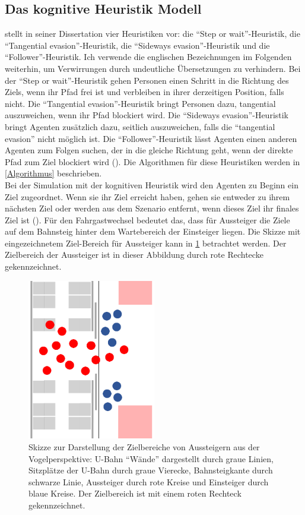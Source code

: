 \subsection{Das kognitive Heuristik Modell} \label{CHM}
\cite{Seitz.2016} stellt in seiner Dissertation vier Heuristiken vor: die "`Step or wait"'-Heuristik, die "`Tangential evasion"'-Heuristik, die "`Sideways evasion"'-Heuristik und die "`Follower"'-Heuristik. Ich verwende die englischen Bezeichnungen im Folgenden weiterhin, um Verwirrungen durch undeutliche Übersetzungen zu verhindern. Bei der "`Step or wait"'-Heuristik gehen Personen einen Schritt in die Richtung des Ziels, wenn ihr Pfad frei ist und verbleiben in ihrer derzeitigen Position, falls nicht. Die "`Tangential evasion"'-Heuristik bringt Personen dazu, tangential auszuweichen, wenn ihr Pfad blockiert wird. Die "`Sideways evasion"'-Heuristik bringt Agenten zusätzlich dazu, seitlich auszuweichen, falls die "`tangential evasion"' nicht möglich ist. Die "`Follower"'-Heuristik lässt Agenten einen anderen Agenten zum Folgen suchen, der in die gleiche Richtung geht, wenn der direkte Pfad zum Ziel blockiert wird (\cite{Seitz.2016}). Die Algorithmen für diese Heuristiken werden in \ref{Algorithmus} beschrieben. \\
Bei der Simulation mit der kognitiven Heuristik wird den Agenten zu Beginn ein Ziel zugeordnet. Wenn sie ihr Ziel erreicht haben, gehen sie entweder zu ihrem nächsten Ziel oder werden aus dem Szenario entfernt, wenn dieses Ziel ihr finales Ziel ist (\cite{Seitz.2016}). Für den Fahrgastwechsel bedeutet das, dass für Aussteiger die Ziele auf dem Bahnsteig hinter dem Wartebereich der Einsteiger liegen.
Die Skizze mit eingezeichnetem Ziel-Bereich für Aussteiger kann in \figurename \ref{fig:SkizzeAussteiger} betrachtet werden. Der Zielbereich der Aussteiger ist in dieser Abbildung durch rote Rechtecke gekennzeichnet.
\begin{figure}[H]
	\centering
		\includegraphics[angle=270, width=0.5\textwidth]{pictures/model/kognitive_heuristic_model/alight_sketch.png}
	\caption{Skizze zur Darstellung der Zielbereiche von Aussteigern aus der Vogelperspektive: U-Bahn "`Wände"' dargestellt durch graue Linien, Sitzplätze der U-Bahn durch graue Vierecke, Bahnsteigkante durch schwarze Linie, Aussteiger durch rote Kreise und Einsteiger durch blaue Kreise. Der Zielbereich ist mit einem roten Rechteck gekennzeichnet.}
	\label{fig:SkizzeAussteiger}
\end{figure}
